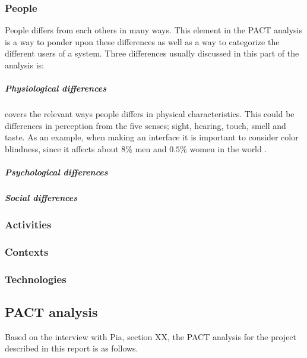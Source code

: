 \subsubsection*{People}
People differs from each others in many ways.
This element in the PACT analysis is a way to ponder upon these differences as well as a way to categorize the different users of a system. 
Three differences usually discussed in this part of the analysis is:

\subparagraph{Physiological differences} covers the relevant ways people differs in physical characteristics.
This could be differences in perception from the five senses; sight, hearing, touch, smell and taste.
As an example, when making an interface it is important to consider color blindness, since it affects about $8\%$ men and $0.5\%$ women in the world \cite{ColourBlind}.



\subparagraph{Psychological differences}

\subparagraph{Social differences}

\subsubsection*{Activities}

\subsubsection*{Contexts}

\subsubsection*{Technologies}






































\subsection{PACT analysis}\label{sec:PACT-analysis}
Based on the interview
with Pia,
{\color{red} section XX}, the PACT analysis for the project described in this report is as follows.

